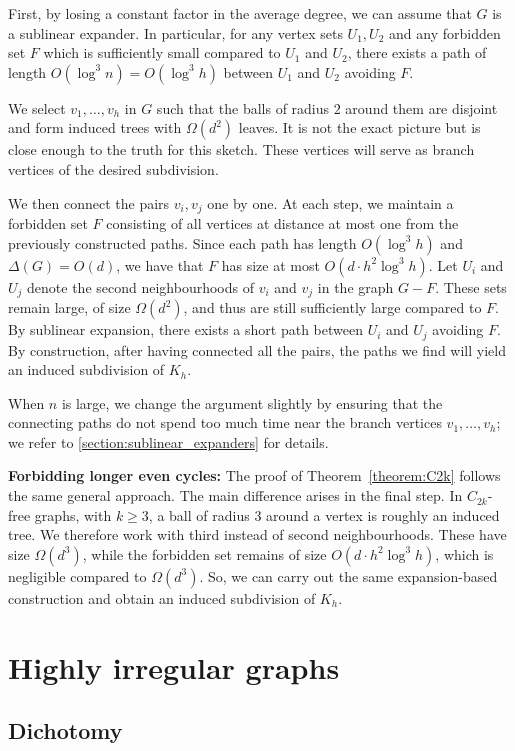 \documentclass[10pt, a4paper]{article}
\numberwithin{theorem}{section} %
\theoremstyle{remark}
\theoremstyle{definition}
\begin{document}
First, by losing a constant factor in the average degree, we can assume that $G$ is a sublinear expander.
In particular, for any vertex sets $U_1, U_2$ and any forbidden set $F$ which is sufficiently small compared to $U_1$ and $U_2$, there exists a path of length $O(\log^3n) = O(\log^3 h)$ between $U_1$ and $U_2$ avoiding $F$.

We select $v_1, \dots, v_h$ in $G$ such that the balls of radius $2$ around them are disjoint and form induced trees with $\Omega(d^2)$ leaves.
It is not the exact picture but is close enough to the truth for this sketch.
These vertices will serve as branch vertices of the desired subdivision.

We then connect the pairs $v_i, v_j$ one by one.
At each step, we maintain a forbidden set $F$ consisting of all vertices at distance at most one from the previously constructed paths.
Since each path has length $O(\log^3h)$ and $\Delta(G) = O(d)$, we have that $F$ has size at most $O(d \cdot h^2 \log^3 h)$.
Let $U_i$ and $U_j$ denote the second neighbourhoods of $v_i$ and $v_j$ in the graph $G - F$.
These sets remain large, of size $\Omega(d^2)$, and thus are still sufficiently large compared to $F$.
By sublinear expansion, there exists a short path between $U_i$ and $U_j$ avoiding $F$. By construction, after having connected all the pairs, the paths we find will yield an induced subdivision of $K_h$.

When $n$ is large, we change the argument slightly by ensuring that the connecting paths do not spend too much time near the branch vertices $v_1, \dots, v_h$; we refer to \cref{section:sublinear_expanders} for details.

\medskip
\noindent\textbf{Forbidding longer even cycles:}
The proof of Theorem~\ref{theorem:C2k} follows the same general approach. The main difference arises in the final step. 
In $C_{2k}$-free graphs, with $k \geq 3$, a ball of radius $3$ around a vertex is roughly an induced tree.
We therefore work with third instead of second neighbourhoods.
These have size $\Omega(d^3)$, while the forbidden set remains of size $O(d \cdot h^2\log^3 h)$, which is negligible compared to $\Omega(d^3)$.
So, we can carry out the same expansion-based construction and obtain an induced subdivision of $K_h$.

\section{Highly irregular graphs}\label{sec:irregular}
\subsection{Dichotomy}
\end{document}
